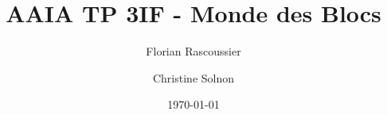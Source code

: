 
\newcommand{\thetitle}{AAIA TP 3IF - Monde des Blocs}
\newcommand{\theauthor}{Florian Rascoussier \and Christine Solnon}

\title{\thetitle}
\author{\theauthor}
\date{\today}